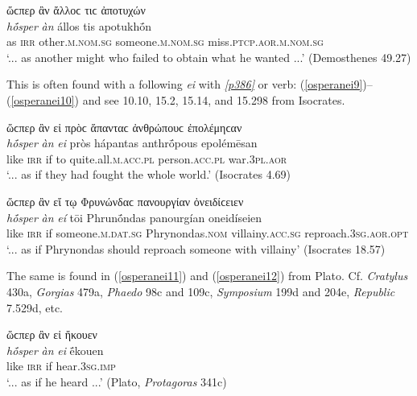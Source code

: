 \begin{exe}
\ex ὥϲπερ ἂν ἄλλοϲ τιϲ ἀποτυχών\\
\gll \emph{hṓsper} \emph{àn} állos tis apotukhṓn\\
as \textsc{irr} other.\textsc{m.nom.sg} someone.\textsc{m.nom.sg} miss.\textsc{ptcp.aor.m.nom.sg}\\
\trans `... as another might who failed to obtain what he wanted ...' (Demosthenes 49.27)
\label{osperan18}
\end{exe}

This is often found with a following \emph{ei} with  \hyperlink{p386}{\emph{[p386]}} or  verb: (\ref{osperanei9})--(\ref{osperanei10}) and see 10.10, 15.2, 15.14, and 15.298 from Isocrates.

\begin{exe}
\ex ὥϲπερ ἂν εἰ πρὸϲ ἅπανταϲ ἀνθρώπουϲ ἐπολέμηϲαν\\
\gll \emph{hṓsper} \emph{àn} \emph{ei} pròs hápantas anthrṓpous epolémēsan\\
like \textsc{irr} if to quite.all.\textsc{m.acc.pl} person.\textsc{acc.pl} war.\textsc{3pl.aor}\\
\trans `... as if they had fought the whole world.' (Isocrates 4.69)
\label{osperanei9}
\end{exe}

\begin{exe}
\ex ὥϲπερ ἂν εἴ τῳ Φρυνώνδαϲ πανουργίαν ὀνειδίϲειεν\\
\gll \emph{hṓsper} \emph{àn} \emph{eí} tōi Phrunṓndas panourgían oneidíseien\\
like \textsc{irr} if someone.\textsc{m.dat.sg} Phrynondas.\textsc{nom}
villainy.\textsc{acc.sg} reproach.\textsc{3sg.aor.opt}\\
\trans `... as if Phrynondas should reproach someone with villainy' (Isocrates 18.57)
\label{osperanei10}
\end{exe}

The same is found in (\ref{osperanei11}) and (\ref{osperanei12}) from Plato. Cf. \textit{Cratylus} 430a, \textit{Gorgias} 479a, \textit{Phaedo} 98c and 109c, \textit{Symposium} 199d and 204e, \textit{Republic} 7.529d, etc.

\begin{exe}
\ex ὥϲπερ ἂν εἰ ἤκουεν\\
\gll \emph{hṓsper} \emph{àn} \emph{ei} ḗkouen\\
like \textsc{irr} if hear.\textsc{3sg.imp}\\
\trans `... as if he heard ...' (Plato, \textit{Protagoras} 341c)
\label{osperanei11}
\end{exe}

